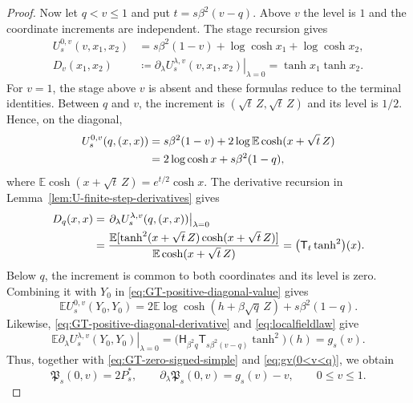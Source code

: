 \documentclass[11pt]{article}
\numberwithin{equation}{section}
\newcommand{\E}{\mathbb{E}}
\newcommand{\1}{\mathbf 1}
\begin{document}
\begin{proof}
Now let $q<v\le1$ and put $t=s\beta^2(v-q)$.  Above $v$ the level is
$1$ and the coordinate increments are independent.  The stage
recursion gives
\begin{align*}
 U_s^{0,v}(v,x_1,x_2)
 &=s\beta^2(1-v)+\log\cosh x_1+\log\cosh x_2,\\
 D_v(x_1,x_2)
 &\coloneqq
 \left.\partial_\lambda U_s^{\lambda,v}(v,x_1,x_2)
 \right|_{\lambda=0}
 =\tanh x_1\tanh x_2.
\end{align*}
For $v=1$, the stage above $v$ is absent and these formulas reduce to
the terminal identities.  Between $q$ and $v$, the increment is
$(\sqrt t\,Z,\sqrt t\,Z)$ and its level is $1/2$.  Hence, on the
diagonal,
\begin{align}
 U_s^{0,v}(q,(x,x))
 &=s\beta^2(1-v)
 +2\log\E\cosh(x+\sqrt t\,Z)\notag\\
 &=2\log\cosh x+s\beta^2(1-q),
 \label{eq:GT-positive-diagonal-value}
\end{align}
where $\E\cosh(x+\sqrt t\,Z)=e^{t/2}\cosh x$.  The derivative
recursion in Lemma~\ref{lem:U-finite-step-derivatives} gives
\begin{align}
 D_q(x,x)
 &=
 \left.\partial_\lambda U_s^{\lambda,v}(q,(x,x))
 \right|_{\lambda=0}\notag\\
 &=\frac{\E[\tanh^2(x+\sqrt t\,Z)
                \cosh(x+\sqrt t\,Z)]}
         {\E\cosh(x+\sqrt t\,Z)}
 =\bigl(\mathsf T_t\tanh^2\bigr)(x).
 \label{eq:GT-positive-diagonal-derivative}
\end{align}
Below $q$, the increment is common to both coordinates and its level
is zero.  Combining it with $Y_0$ in
\eqref{eq:GT-positive-diagonal-value} gives
\[
 \E U_s^{0,v}(Y_0,Y_0)
 =2\E\log\cosh(h+\beta\sqrt q\,Z)+s\beta^2(1-q).
\]
Likewise, \eqref{eq:GT-positive-diagonal-derivative} and
\eqref{eq:localfieldlaw} give
\[
 \E\left.
 \partial_\lambda U_s^{\lambda,v}(Y_0,Y_0)
 \right|_{\lambda=0}
 =\bigl(\mathsf H_{\beta^2q}
       \mathsf T_{s\beta^2(v-q)}\tanh^2\bigr)(h)
 =g_s(v) .
\]
Thus, together with \eqref{eq:GT-zero-signed-simple} and \eqref{eq:gv(0<v<q)}, we obtain
\begin{equation}
 \mathfrak P_s(0,v)=2P_s^*,
 \qquad
 \partial_\lambda\mathfrak P_s(0,v)=g_s(v)-v,
 \qquad 0\le v\le1.
 \label{eq:GT-zero-positive-simple}
\end{equation}


\end{proof}
\end{document}
